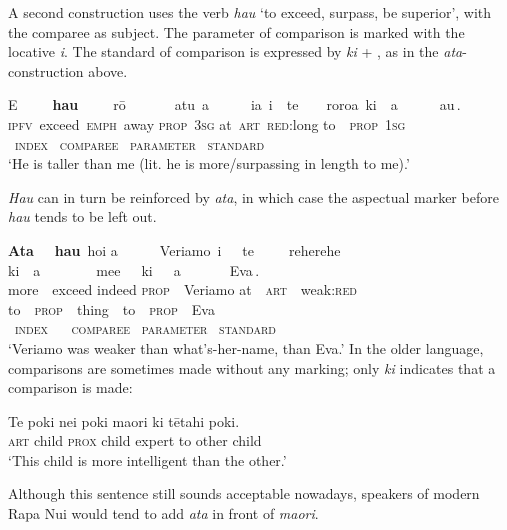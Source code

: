 A second construction uses the verb \textit{hau} ‘to exceed, surpass, be superior’, with the comparee as subject. The parameter of comparison is marked with the locative  \textit{{\ꞌ}i}. The standard of comparison is expressed by \textit{ki} + , as in the \textit{{\ꞌ}ata}{}-construction above. 

\ea\label{ex:3.114}
\glll {\ob}E~~~~~\textbf{hau}~~~~~rō~~~~~~~atu\,{\cb} {\ob}a~~~~~~ia\,{\cb} {\ob}{\ꞌ}i~~te~~~~roroa\,{\cb} {\ob}ki~~a~~~~~~au\,{\cb}. \\
{\db}\textsc{ipfv}~exceed~\textsc{emph}~away {\db}\textsc{prop}~\textsc{3sg} {\db}at~\textsc{art}~\textsc{red}:long {\db}to~~\textsc{prop}~\textsc{1sg} \\
\textsc{~index} \textsc{~comparee} \textsc{~parameter} \textsc{~standard} \\

\glt
‘He is taller than me (lit. he is more/surpassing in length to me).’ \textstyleExampleref{[Notes]}
\z

\textit{Hau} can in turn be reinforced by \textit{{\ꞌ}ata}, in which case the aspectual marker before \textit{hau} tends to be left out.

\ea\label{ex:3.115}
\glll {\ob}\textbf{{\ꞌ}Ata}~~~\textbf{hau}\,{\cb} ho{\ꞌ}i {\ob}a~~~~~~Veriamo\,{\cb} {\ob}{\ꞌ}i~~~te~~~~~reherehe\,{\cb} {\ob}ki~~a~~~~~~~~me{\ꞌ}e~~~ki~~~a~~~~~~~Eva\,{\cb}. \\
{\db}more~~exceed indeed {\db}\textsc{prop}~~Veriamo {\db}at~~\textsc{art}~~weak:\textsc{red} {\db}to~~\textsc{prop}~~thing~~to~~\textsc{prop}~~Eva \\
\textsc{~index} ~ \textsc{~comparee} \textsc{~parameter} \textsc{~standard} \\

\glt
‘Veriamo was weaker than what’s-her-name, than Eva.’ \textstyleExampleref{[R416.171]} 
\z
In the older language, comparisons are sometimes made without any marking; only \textit{ki} indicates that a comparison is made:

\ea\label{ex:3.116}
\gll Te poki nei poki ma{\ꞌ}ori ki tētahi poki. \\
\textsc{art} child \textsc{prox} child expert to other child \\

\glt
‘This child is more intelligent than the other.’ 
\z

Although this sentence still sounds acceptable nowadays, speakers of modern Rapa Nui would tend to add \textit{{\ꞌ}ata} in front of \textit{ma{\ꞌ}ori}.

